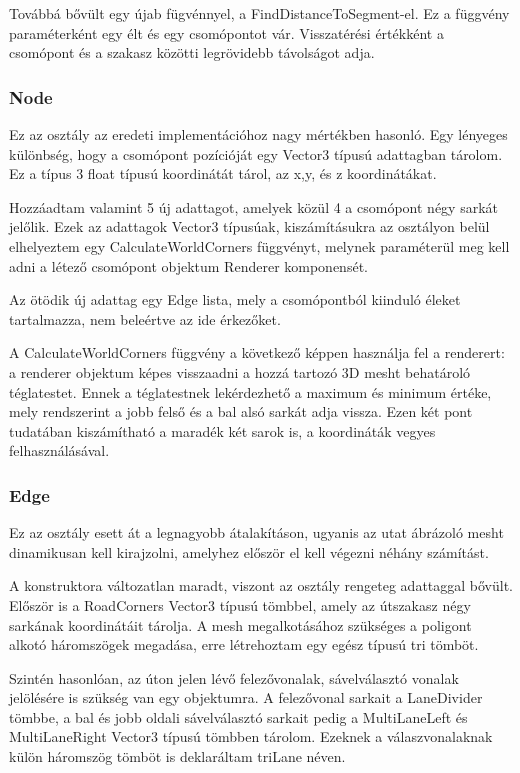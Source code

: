 Továbbá bővült egy újab fügvénnyel, a FindDistanceToSegment-el. Ez a függvény paraméterként egy élt és egy csomópontot vár. Visszatérési értékként a csomópont és a szakasz közötti legrövidebb távolságot adja.
\subsubsection{Node}
Ez az osztály az eredeti implementációhoz nagy mértékben hasonló. Egy lényeges különbség, hogy a csomópont pozícióját egy Vector3 típusú adattagban tárolom. Ez a típus 3 float típusú koordinátát tárol, az x,y, és z koordinátákat.

Hozzáadtam valamint 5 új adattagot, amelyek közül 4 a csomópont négy sarkát jelőlik. Ezek az adattagok Vector3 típusúak, kiszámításukra az osztályon belül elhelyeztem egy CalculateWorldCorners függvényt, melynek paraméterül meg kell adni a létező csomópont objektum Renderer komponensét.

Az ötödik új adattag egy Edge lista, mely a csomópontból kiinduló éleket tartalmazza, nem beleértve az ide érkezőket.

A CalculateWorldCorners függvény a következő képpen használja fel a renderert: a renderer objektum képes visszaadni a hozzá tartozó 3D mesht behatároló téglatestet. Ennek a téglatestnek lekérdezhető a maximum és minimum értéke, mely rendszerint a jobb felső és a bal alsó sarkát adja vissza. Ezen két pont tudatában kiszámítható a maradék két sarok is, a koordináták vegyes felhasználásával.
\subsubsection{Edge}
Ez az osztály esett át a legnagyobb átalakításon, ugyanis az utat ábrázoló mesht dinamikusan kell kirajzolni, amelyhez először el kell végezni néhány számítást.

A konstruktora változatlan maradt, viszont az osztály rengeteg adattaggal bővült. Először is a RoadCorners Vector3 típusú tömbbel, amely az útszakasz négy sarkának koordinátáit tárolja. A mesh megalkotásához szükséges a poligont alkotó háromszögek megadása, erre létrehoztam egy egész típusú tri tömböt.

Szintén hasonlóan, az úton jelen lévő felezővonalak, sávelválasztó vonalak jelölésére is szükség van egy objektumra. A felezővonal sarkait a LaneDivider tömbbe, a bal és jobb oldali sávelválasztó sarkait pedig a MultiLaneLeft és MultiLaneRight Vector3 típusú tömbben tárolom. Ezeknek a válaszvonalaknak külön háromszög tömböt is deklaráltam triLane néven.

